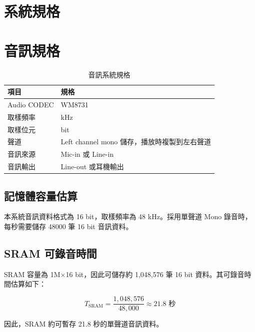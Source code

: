 \section{系統規格}

\section{音訊規格}

\begin{table}[htbp]
    \centering
    \caption{音訊系統規格}
    \label{tab:audio_spec}
    \renewcommand{\arraystretch}{1.3}
    \begin{tabular}{>{\centering\arraybackslash}p{4cm}
                    >{\centering\arraybackslash}p{7cm}}
        \toprule
        項目 & 規格 \\
        \midrule
        Audio CODEC & WM8731 \\
        取樣頻率 & 48 kHz \\
        取樣位元 & 16 bit \\
        聲道 & Left channel mono 儲存，播放時複製到左右聲道 \\
        音訊來源 & Mic-in 或 Line-in \\
        音訊輸出 & Line-out 或耳機輸出 \\
        \bottomrule
    \end{tabular}
\end{table}

\subsection{記憶體容量估算}

本系統音訊資料格式為 16 bit，取樣頻率為 48 kHz。採用單聲道 Mono 錄音時，每秒需要儲存 48000 筆 16 bit 音訊資料。

\subsection{SRAM 可錄音時間}

SRAM 容量為 1M$\times$16 bit，因此可儲存約 1,048,576 筆 16 bit 資料。其可錄音時間估算如下：

\[
T_{\mathrm{SRAM}} = \frac{1{,}048{,}576}{48{,}000} \approx 21.8 \text{ 秒}
\]

因此，SRAM 約可暫存 21.8 秒的單聲道音訊資料。
